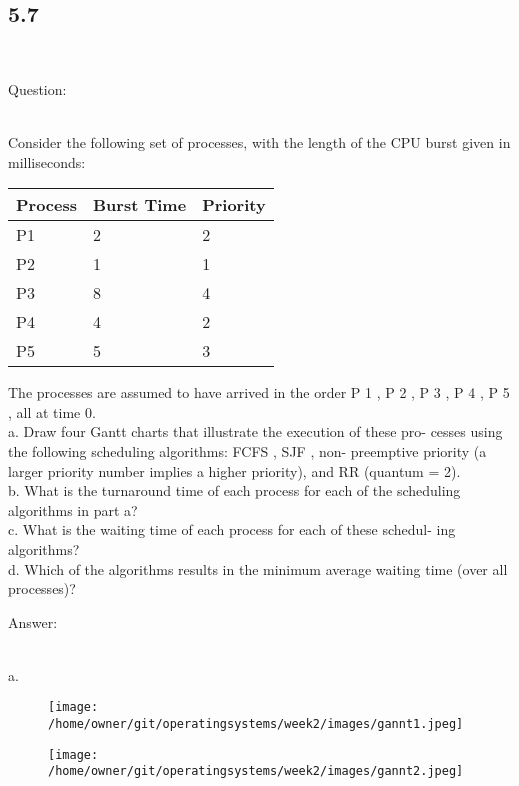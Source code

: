\documentclass[]{article}
\begin{document}
\subsection*{5.7}\
\begin{bfseries} Question: \end{bfseries}\\
Consider the following set of processes, with the length of the CPU burst
given in milliseconds:\\
\begin{tabular}{|l|l|l|}
Process & Burst Time & Priority\\
\hline
P1 & 2 & 2 \\
\hline
P2 & 1 & 1 \\
\hline
P3 & 8 & 4 \\
\hline
P4 & 4 & 2 \\
\hline
P5 & 5 & 3 \\
\end {tabular}

The processes are assumed to have arrived in the order P 1 , P 2 , P 3 , P 4 , P 5 ,
all at time 0.\\

a. Draw four Gantt charts that illustrate the execution of these pro-
cesses using the following scheduling algorithms: FCFS , SJF , non-
preemptive priority (a larger priority number implies a higher
priority), and RR (quantum = 2).\\
b. What is the turnaround time of each process for each of the
scheduling algorithms in part a?\\
c. What is the waiting time of each process for each of these schedul-
ing algorithms?\\
d. Which of the algorithms results in the minimum average waiting
time (over all processes)?\\

\begin{bfseries} Answer: \end{bfseries}\\
a.\\

\begin{figure}[H]
  \texttt{[image: /home/owner/git/operatingsystems/week2/images/gannt1.jpeg]}
\end{figure}

\begin{figure}[H]
  \texttt{[image: /home/owner/git/operatingsystems/week2/images/gannt2.jpeg]}
\end{figure}
 
\end{document}
